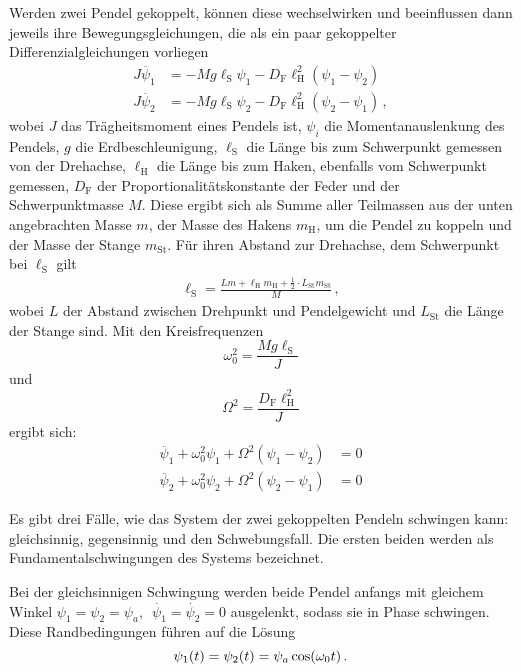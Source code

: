\documentclass[12pt,a4paper]{scrartcl}
\newcommand{\lh}{\ell_{\mathrm{H}}}
\newcommand{\ls}{\ell_{\mathrm{S}}}
\begin{document}
Werden zwei Pendel gekoppelt, können diese wechselwirken und beeinflussen dann jeweils ihre Bewegungsgleichungen, die als ein paar gekoppelter Differenzialgleichungen vorliegen
\begin{align}
	J\ddot{\psi_1} &= -Mg\ls\psi_1 - D_{\text{F}}\lh^2(\psi_1-\psi_2)\\
	J\ddot{\psi_2} &= -Mg\ls\psi_2 - D_{\text{F}}\lh^2(\psi_2-\psi_1)\,,
\end{align}
wobei \(J\) das Trägheitsmoment eines Pendels ist, \(\psi_i\) die Momentanauslenkung des Pendels, \(g\) die Erdbeschleunigung, \(\ls\) die Länge bis zum Schwerpunkt gemessen von der Drehachse, \(\lh\) die Länge bis zum Haken, ebenfalls vom Schwerpunkt gemessen, \(D_{\text{F}}\) der Proportionalitätskonstante der Feder und der Schwerpunktmasse \(M\). Diese  ergibt sich als Summe aller Teilmassen aus der unten angebrachten Masse \(m\),  der Masse des Hakens \(m_{\text{H}}\), um die Pendel zu koppeln und der Masse der Stange \(m_{\text{St}}\). Für ihren Abstand zur Drehachse, dem Schwerpunkt bei \(\ell_{\text{S}}\) gilt
\begin{align}\label{eq:schwerp}
	\ell_{\text{S}} = \frac{Lm + \lh m_{\text{H}} + \frac{1}{2} \cdot L_{\text{St}} m_{\text{St}}}{M} \,,
\end{align}
wobei \(L\) der Abstand zwischen Drehpunkt und Pendelgewicht und \(L_{\text{St}}\) die Länge der Stange sind.
Mit den Kreisfrequenzen
\begin{equation}\label{eq:eig}
	\omega_0^2=\frac{Mg\ls}{J}
\end{equation}
und
\begin{equation}
	\Omega^2=\frac{D_{\text{F}}\lh^2}{J}
\end{equation}
ergibt sich:
\begin{align}
	\ddot{\psi_1} + \omega_0^2\psi_1 + \Omega^2(\psi_1-\psi_2) &= 0\\
	\ddot{\psi_2} + \omega_0^2\psi_2 + \Omega^2(\psi_2-\psi_1) &= 0
\end{align}

Es gibt drei Fälle, wie das System der zwei gekoppelten Pendeln schwingen kann: gleichsinnig, gegensinnig und den Schwebungsfall. Die ersten beiden werden als Fundamentalschwingungen des Systems bezeichnet.

Bei der gleichsinnigen Schwingung werden beide Pendel anfangs mit gleichem Winkel \(\psi_1 = \psi_2 = \psi_a, \enspace \dot{\psi_1} = \dot{\psi_2} = 0\) ausgelenkt, sodass sie in Phase schwingen. Diese Randbedingungen führen auf die Lösung
\begin{equation}
	\psi_1(t) = \psi_2(t) = \psi_a \cos\mleft(\omega_0t\mright) \,.
\end{equation}
\end{document}
